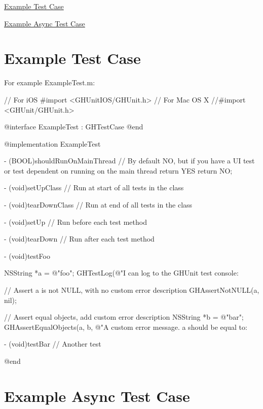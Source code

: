 
\begin{DoxyItemize}
\item \hyperlink{_examples_ExampleTestCase}{\-Example \-Test \-Case}
\item \hyperlink{_examples_ExampleAsyncTestCase}{\-Example \-Async \-Test \-Case}
\end{DoxyItemize}\hypertarget{_examples_ExampleTestCase}{}\section{\-Example Test Case}\label{_examples_ExampleTestCase}
\-For example {\ttfamily \-Example\-Test.\-m}\-:


\begin{DoxyCode}
 // For iOS
 #import <GHUnitIOS/GHUnit.h> 
 // For Mac OS X
 //#import <GHUnit/GHUnit.h>
 
 @interface ExampleTest : GHTestCase { }
 @end
 
 @implementation ExampleTest
 
 - (BOOL)shouldRunOnMainThread {
   // By default NO, but if you have a UI test or test dependent on running on
       the main thread return YES
   return NO;
 }
 
 - (void)setUpClass {
   // Run at start of all tests in the class
 }
 
 - (void)tearDownClass {
   // Run at end of all tests in the class
 }
 
 - (void)setUp {
   // Run before each test method
 }
 
 - (void)tearDown {
   // Run after each test method
 }      
 
 - (void)testFoo {       
   NSString *a = @"foo";
   GHTestLog(@"I can log to the GHUnit test console: %
 
   // Assert a is not NULL, with no custom error description
   GHAssertNotNULL(a, nil);
 
   // Assert equal objects, add custom error description
   NSString *b = @"bar";
   GHAssertEqualObjects(a, b, @"A custom error message. a should be equal to:
 }
 
 - (void)testBar {
   // Another test
 }
 
 @end
\end{DoxyCode}
\hypertarget{_examples_ExampleAsyncTestCase}{}\section{\-Example Async Test Case}\label{_examples_ExampleAsyncTestCase}

